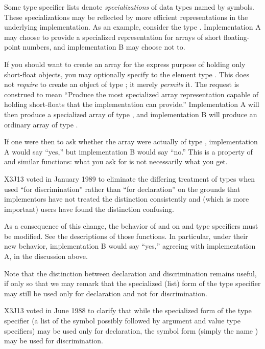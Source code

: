 Some type specifier lists denote \emph{specializations} of
data types named by symbols.  These specializations may be
reflected by more efficient representations in the underlying
implementation.  As an example, consider the type .
Implementation A may choose to provide a specialized representation
for arrays of short floating-point numbers, and implementation B
may choose not to.

If you should want to create an array for the
express purpose of holding only short-float objects, you may
optionally specify to  the element type
.  This does not \emph{require}  to create
an object of type ; it merely \emph{permits} it.  The
request is construed to mean ``Produce the most specialized array
representation capable of holding short-floats that the implementation
can provide.''  Implementation A will then produce a specialized
array of type , and implementation B
will produce an ordinary array of type .

If one were then to ask whether the array were actually of type
, implementation A would say ``yes,'' but
implementation B would say ``no.''  This is a property of 
and similar functions: what you ask for is not necessarily what you get. 

\begin{new}
X3J13 voted in January 1989
to eliminate the differing treatment of types
when used ``for discrimination'' rather than ``for declaration'' on the grounds
that implementors have not treated the distinction consistently
and (which is more important) users have found the distinction confusing.

As a consequence of this change, the behavior of  and 
on  and  type specifiers must be modified.
See the descriptions of those functions.  In particular, under their new
behavior, implementation B would say ``yes,'' agreeing with implementation A,
in the discussion above.

Note that the distinction between declaration and discrimination remains
useful, if only so that we may remark that the specialized (list)
form of the
 type specifier may still be used only for declaration and
not for discrimination.
\end{new}

\begin{new}
X3J13 voted in June 1988  to clarify that
while the specialized form of the  type specifier
(a list of the symbol  possibly followed by
argument and value type specifiers)
may be used only for declaration, the symbol form (simply the name
) may be used for discrimination.
\end{new}

